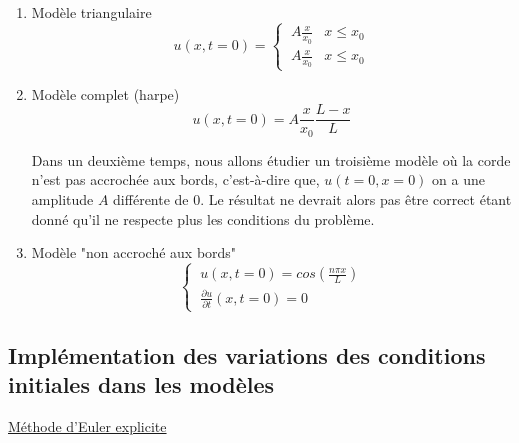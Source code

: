 \begin{enumerate}
    \item Modèle triangulaire
    \begin{equation}
       u(x,t=0)=\left\{
            \begin{array}{ll}
               \ A \frac{x}{x_{0}} &  x\leq x_{0} \\
               \ A \frac{x}{x_{0}} &  x\leq x_{0}
            \end{array}
        \right.
    \end{equation}
    
    
    \item Modèle complet (harpe)
    \begin{equation}
        u(x,t=0)=A\frac{x}{x_{0}}\frac{L-x}{L}
    \end{equation}
    
Dans un deuxième temps, nous allons étudier un troisième modèle où la corde n'est pas accrochée aux bords, c'est-à-dire que, $u(t=0,x=0)$ on a une amplitude $A$ différente de $0$. Le résultat ne devrait alors pas être correct étant donné qu'il ne respecte plus les conditions du problème.
\newline

 \item Modèle "non accroché aux bords"
    \begin{equation}
       \left\{
            \begin{array}{ll}
               \  u(x,t=0)=cos(\frac{n \pi x}{L})  \\
               \ \frac{\partial{u}}{\partial{t}}(x,t=0)=0 
            \end{array}
        \right.
    \end{equation}
    
    
    
    
    
    
\end{enumerate}


\vspace*{2cm}
\subsection{Implémentation des variations des conditions initiales dans les modèles}


\underline{Méthode d'Euler explicite}



